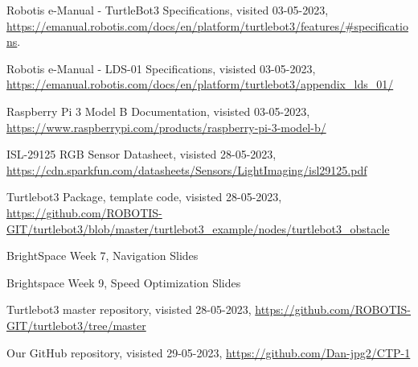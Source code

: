 \documentclass[conference]{IEEEtran}
\begin{document}
\begin{thebibliography}{00}
 \raggedright Robotis e-Manual - TurtleBot3 Specifications, visited 03-05-2023, \url{https://emanual.robotis.com/docs/en/platform/turtlebot3/features/#specifications}.
 \raggedright Robotis e-Manual - LDS-01 Specifications, visisted 03-05-2023, \url{https://emanual.robotis.com/docs/en/platform/turtlebot3/appendix_lds_01/}
 \raggedright Raspberry Pi 3 Model B Documentation, visisted 03-05-2023, \url{https://www.raspberrypi.com/products/raspberry-pi-3-model-b/}
 \raggedright ISL-29125 RGB Sensor Datasheet, visisted 28-05-2023, \url{https://cdn.sparkfun.com/datasheets/Sensors/LightImaging/isl29125.pdf}
 \raggedright Turtlebot3 Package, template code, visisted 28-05-2023, \url{https://github.com/ROBOTIS-GIT/turtlebot3/blob/master/turtlebot3_example/nodes/turtlebot3_obstacle}
 \raggedright BrightSpace Week 7, Navigation Slides
 \raggedright Brightspace Week 9, Speed Optimization Slides
 \raggedright Turtlebot3 master repository, visisted 28-05-2023, \url{https://github.com/ROBOTIS-GIT/turtlebot3/tree/master}
 \raggedright Our GitHub repository, visisted 29-05-2023, \url{https://github.com/Dan-jpg2/CTP-1}

\end{thebibliography}
\end{document}

